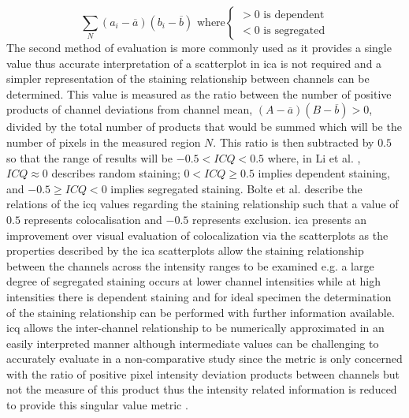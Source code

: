 \begin{equation}\label{eq:ica}
    \sum_N (a_i - \overline{a})(b_i - \overline{b}) \text{ where}
    \begin{cases}
    > 0 \text{ is dependent}\\
    < 0 \text{ is segregated}
    \end{cases}
\end{equation}
The second method of evaluation is more commonly used as it provides a single value thus accurate interpretation of a scatterplot in \gls{ica} is not required and a simpler representation of the staining relationship between channels can be determined. This value is measured as the ratio between the number of positive products of channel deviations from channel mean, $(A-\overline{a})(B-\overline{b}) > 0$, divided by the total number of products that would be summed which will be the number of pixels in the measured region $N$. This ratio is then subtracted by $0.5$ so that the range of results will be $-0.5<ICQ<0.5$ where, in Li et al. \cite[p. 4074]{Li4070}, $ICQ \approx 0$ describes random staining; $0<ICQ\geq 0.5$ implies dependent staining, and $-0.5\geq ICQ < 0$ implies segregated staining. Bolte et al. \cite[p. 227]{Bolte-2006} describe the relations of the \gls{icq} values regarding the staining relationship such that a value of $0.5$ represents colocalisation and $-0.5$ represents exclusion. \gls{ica} presents an improvement over visual evaluation of colocalization via the scatterplots as the properties described by the \gls{ica} scatterplots allow the staining relationship between the channels across the intensity ranges to be examined e.g. a large degree of segregated staining occurs at lower channel intensities while at high intensities there is dependent staining and for ideal specimen the determination of the staining relationship can be performed with further information available. \gls{icq} allows the inter-channel relationship to be 
numerically approximated in an easily interpreted manner although intermediate values can be challenging to accurately evaluate in a non-comparative study since the metric is only concerned with the ratio of positive pixel intensity deviation products between channels but not the measure of this product thus the intensity related information is reduced to provide this singular value metric \cite{Bolte-2006}.

